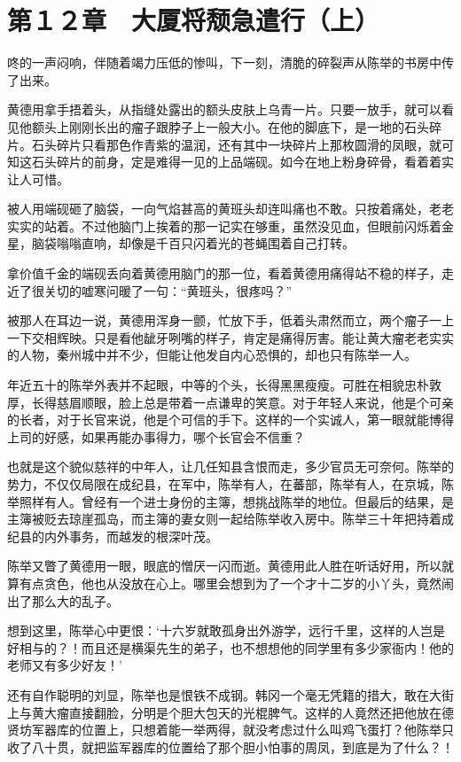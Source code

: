 \section{第１２章　大厦将颓急遣行（上）}

咚的一声闷响，伴随着竭力压低的惨叫，下一刻，清脆的碎裂声从陈举的书房中传了出来。

黄德用拿手捂着头，从指缝处露出的额头皮肤上乌青一片。只要一放手，就可以看见他额头上刚刚长出的瘤子跟脖子上一般大小。在他的脚底下，是一地的石头碎片。石头碎片只看那色作青紫的温润，还有其中一块碎片上那枚圆滑的凤眼，就可知这石头碎片的前身，定是难得一见的上品端砚。如今在地上粉身碎骨，看着着实让人可惜。

被人用端砚砸了脑袋，一向气焰甚高的黄班头却连叫痛也不敢。只按着痛处，老老实实的站着。不过他脑门上挨着的那一记实在够重，虽然没见血，但眼前闪烁着金星，脑袋嗡嗡直响，却像是千百只闪着光的苍蝇围着自己打转。

拿价值千金的端砚丢向着黄德用脑门的那一位，看着黄德用痛得站不稳的样子，走近了很关切的嘘寒问暖了一句：“黄班头，很疼吗？”

被那人在耳边一说，黄德用浑身一颤，忙放下手，低着头肃然而立，两个瘤子一上一下交相辉映。只是看他龇牙咧嘴的样子，肯定是痛得厉害。能让黄大瘤老老实实的人物，秦州城中并不少，但能让他发自内心恐惧的，却也只有陈举一人。

年近五十的陈举外表并不起眼，中等的个头，长得黑黑瘦瘦。可胜在相貌忠朴敦厚，长得慈眉顺眼，脸上总是带着一点谦卑的笑意。对于年轻人来说，他是个可亲的长者，对于长官来说，他是个可信的手下。这样的一个实诚人，第一眼就能博得上司的好感，如果再能办事得力，哪个长官会不信重？

也就是这个貌似慈祥的中年人，让几任知县含恨而走，多少官员无可奈何。陈举的势力，不仅仅局限在成纪县，在军中，陈举有人，在蕃部，陈举有人，在京城，陈举照样有人。曾经有一个进士身份的主簿，想挑战陈举的地位。但最后的结果，是主簿被贬去琼崖孤岛，而主簿的妻女则一起给陈举收入房中。陈举三十年把持着成纪县的内外事务，而越发的根深叶茂。

陈举又瞥了黄德用一眼，眼底的憎厌一闪而逝。黄德用此人胜在听话好用，所以就算有点贪色，他也从没放在心上。哪里会想到为了一个才十二岁的小丫头，竟然闹出了那么大的乱子。

想到这里，陈举心中更恨：‘十六岁就敢孤身出外游学，远行千里，这样的人岂是好相与的？！而且还是横渠先生的弟子，也不想想他的同学里有多少家衙内！他的老师又有多少好友！’

还有自作聪明的刘显，陈举也是恨铁不成钢。韩冈一个毫无凭籍的措大，敢在大街上与黄大瘤直接翻脸，分明是个胆大包天的光棍脾气。这样的人竟然还把他放在德贤坊军器库的位置上，只想着能一举两得，就没考虑过什么叫鸡飞蛋打？他陈举只收了八十贯，就把监军器库的位置给了那个胆小怕事的周凤，到底是为了什么？！

